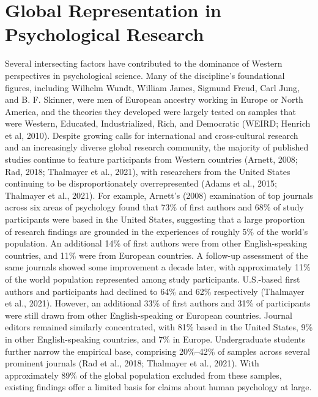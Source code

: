 \documentclass[
  11pt,
]{book}
\begin{document}
\section{Global Representation in Psychological Research}\label{global-representation-in-psychological-research}

Several intersecting factors have contributed to the dominance of Western perspectives in psychological science. Many of the discipline's foundational figures, including Wilhelm Wundt, William James, Sigmund Freud, Carl Jung, and B. F. Skinner, were men of European ancestry working in Europe or North America, and the theories they developed were largely tested on samples that were Western, Educated, Industrialized, Rich, and Democratic (WEIRD; Henrich et al, 2010). Despite growing calls for international and cross-cultural research and an increasingly diverse global research community, the majority of published studies continue to feature participants from Western countries (Arnett, 2008; Rad, 2018; Thalmayer et al., 2021), with researchers from the United States continuing to be disproportionately overrepresented (Adams et al., 2015; Thalmayer et al., 2021). For example, Arnett's (2008) examination of top journals across six areas of psychology found that 73\% of first authors and 68\% of study participants were based in the United States, suggesting that a large proportion of research findings are grounded in the experiences of roughly 5\% of the world's population. An additional 14\% of first authors were from other English-speaking countries, and 11\% were from European countries. A follow-up assessment of the same journals showed some improvement a decade later, with approximately 11\% of the world population represented among study participants. U.S.-based first authors and participants had declined to 64\% and 62\% respectively (Thalmayer et al., 2021). However, an additional 33\% of first authors and 31\% of participants were still drawn from other English-speaking or European countries. Journal editors remained similarly concentrated, with 81\% based in the United States, 9\% in other English-speaking countries, and 7\% in Europe. Undergraduate students further narrow the empirical base, comprising 20\%--42\% of samples across several prominent journals (Rad et al., 2018; Thalmayer et al., 2021). With approximately 89\% of the global population excluded from these samples, existing findings offer a limited basis for claims about human psychology at large.
\end{document}
